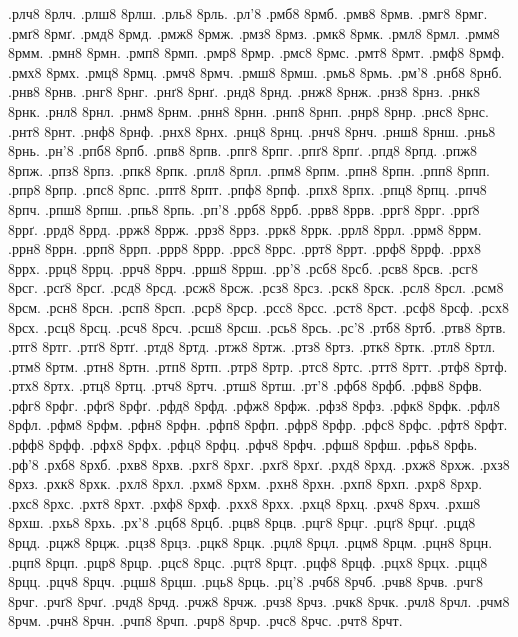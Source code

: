 {.рлч8
8рлч.
.рлш8
8рлш.
.рль8
8рль.
.рл'8
.рмб8
8рмб.
.рмв8
8рмв.
.рмг8
8рмг.
.рмґ8
8рмґ.
.рмд8
8рмд.
.рмж8
8рмж.
.рмз8
8рмз.
.рмк8
8рмк.
.рмл8
8рмл.
.рмм8
8рмм.
.рмн8
8рмн.
.рмп8
8рмп.
.рмр8
8рмр.
.рмс8
8рмс.
.рмт8
8рмт.
.рмф8
8рмф.
.рмх8
8рмх.
.рмц8
8рмц.
.рмч8
8рмч.
.рмш8
8рмш.
.рмь8
8рмь.
.рм'8
.рнб8
8рнб.
.рнв8
8рнв.
.рнг8
8рнг.
.рнґ8
8рнґ.
.рнд8
8рнд.
.рнж8
8рнж.
.рнз8
8рнз.
.рнк8
8рнк.
.рнл8
8рнл.
.рнм8
8рнм.
.рнн8
8рнн.
.рнп8
8рнп.
.рнр8
8рнр.
.рнс8
8рнс.
.рнт8
8рнт.
.рнф8
8рнф.
.рнх8
8рнх.
.рнц8
8рнц.
.рнч8
8рнч.
.рнш8
8рнш.
.рнь8
8рнь.
.рн'8
.рпб8
8рпб.
.рпв8
8рпв.
.рпг8
8рпг.
.рпґ8
8рпґ.
.рпд8
8рпд.
.рпж8
8рпж.
.рпз8
8рпз.
.рпк8
8рпк.
.рпл8
8рпл.
.рпм8
8рпм.
.рпн8
8рпн.
.рпп8
8рпп.
.рпр8
8рпр.
.рпс8
8рпс.
.рпт8
8рпт.
.рпф8
8рпф.
.рпх8
8рпх.
.рпц8
8рпц.
.рпч8
8рпч.
.рпш8
8рпш.
.рпь8
8рпь.
.рп'8
.ррб8
8ррб.
.ррв8
8ррв.
.ррг8
8ррг.
.ррґ8
8ррґ.
.ррд8
8ррд.
.ррж8
8ррж.
.ррз8
8ррз.
.ррк8
8ррк.
.ррл8
8ррл.
.ррм8
8ррм.
.ррн8
8ррн.
.ррп8
8ррп.
.ррр8
8ррр.
.ррс8
8ррс.
.ррт8
8ррт.
.ррф8
8ррф.
.ррх8
8ррх.
.ррц8
8ррц.
.ррч8
8ррч.
.ррш8
8ррш.
.рр'8
.рсб8
8рсб.
.рсв8
8рсв.
.рсг8
8рсг.
.рсґ8
8рсґ.
.рсд8
8рсд.
.рсж8
8рсж.
.рсз8
8рсз.
.рск8
8рск.
.рсл8
8рсл.
.рсм8
8рсм.
.рсн8
8рсн.
.рсп8
8рсп.
.рср8
8рср.
.рсс8
8рсс.
.рст8
8рст.
.рсф8
8рсф.
.рсх8
8рсх.
.рсц8
8рсц.
.рсч8
8рсч.
.рсш8
8рсш.
.рсь8
8рсь.
.рс'8
.ртб8
8ртб.
.ртв8
8ртв.
.ртг8
8ртг.
.ртґ8
8ртґ.
.ртд8
8ртд.
.ртж8
8ртж.
.ртз8
8ртз.
.ртк8
8ртк.
.ртл8
8ртл.
.ртм8
8ртм.
.ртн8
8ртн.
.ртп8
8ртп.
.ртр8
8ртр.
.ртс8
8ртс.
.ртт8
8ртт.
.ртф8
8ртф.
.ртх8
8ртх.
.ртц8
8ртц.
.ртч8
8ртч.
.ртш8
8ртш.
.рт'8
.рфб8
8рфб.
.рфв8
8рфв.
.рфг8
8рфг.
.рфґ8
8рфґ.
.рфд8
8рфд.
.рфж8
8рфж.
.рфз8
8рфз.
.рфк8
8рфк.
.рфл8
8рфл.
.рфм8
8рфм.
.рфн8
8рфн.
.рфп8
8рфп.
.рфр8
8рфр.
.рфс8
8рфс.
.рфт8
8рфт.
.рфф8
8рфф.
.рфх8
8рфх.
.рфц8
8рфц.
.рфч8
8рфч.
.рфш8
8рфш.
.рфь8
8рфь.
.рф'8
.рхб8
8рхб.
.рхв8
8рхв.
.рхг8
8рхг.
.рхґ8
8рхґ.
.рхд8
8рхд.
.рхж8
8рхж.
.рхз8
8рхз.
.рхк8
8рхк.
.рхл8
8рхл.
.рхм8
8рхм.
.рхн8
8рхн.
.рхп8
8рхп.
.рхр8
8рхр.
.рхс8
8рхс.
.рхт8
8рхт.
.рхф8
8рхф.
.рхх8
8рхх.
.рхц8
8рхц.
.рхч8
8рхч.
.рхш8
8рхш.
.рхь8
8рхь.
.рх'8
.рцб8
8рцб.
.рцв8
8рцв.
.рцг8
8рцг.
.рцґ8
8рцґ.
.рцд8
8рцд.
.рцж8
8рцж.
.рцз8
8рцз.
.рцк8
8рцк.
.рцл8
8рцл.
.рцм8
8рцм.
.рцн8
8рцн.
.рцп8
8рцп.
.рцр8
8рцр.
.рцс8
8рцс.
.рцт8
8рцт.
.рцф8
8рцф.
.рцх8
8рцх.
.рцц8
8рцц.
.рцч8
8рцч.
.рцш8
8рцш.
.рць8
8рць.
.рц'8
.рчб8
8рчб.
.рчв8
8рчв.
.рчг8
8рчг.
.рчґ8
8рчґ.
.рчд8
8рчд.
.рчж8
8рчж.
.рчз8
8рчз.
.рчк8
8рчк.
.рчл8
8рчл.
.рчм8
8рчм.
.рчн8
8рчн.
.рчп8
8рчп.
.рчр8
8рчр.
.рчс8
8рчс.
.рчт8
8рчт.
}
